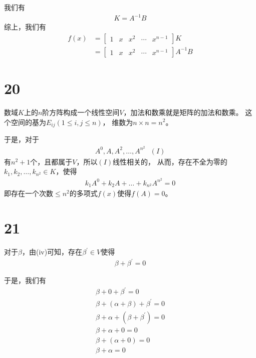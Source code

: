 \documentclass{article}
\begin{document}
我们有
\begin{align*}
  K = A^{-1} B
\end{align*}
综上，我们有
\begin{align*}
  f(x) & = \begin{bmatrix}
             1 & x & x^2 & \cdots & x^{n-1}
           \end{bmatrix} K \\
       & = \begin{bmatrix}
        1 & x & x^2 & \cdots & x^{n-1}
      \end{bmatrix} A^{-1} B
\end{align*}

\section*{20}

数域$K$上的$n$阶方阵构成一个线性空间$V$，加法和数乘就是矩阵的加法和数乘。
这个空间的基为$E_{ij} (1 \leq i,j \leq n)$，
维数为$n \times n = n^2$。

于是，对于
\begin{align*}
  A^{0}, A, A^{2}, \dots, A^{n^2} \ \ \ (I)
\end{align*}
有$n^2 + 1$个，且都属于$V$，所以$(I)$线性相关的，
从而，存在不全为零的$k_1, k_2, \dots, k_{n^2} \in K$，使得
\begin{align*}
  k_1 A^{0} + k_2 A + \dots + k_{n^2} A^{n^2} = 0
\end{align*}
即存在一个次数$\leq n^2$的多项式$f(x)$使得$f(A) = 0$。

\section*{21}

对于$\beta$，由(iv)可知，存在$\beta^\prime \in V$使得
\begin{align*}
  \beta + \beta^\prime = 0
\end{align*}

于是，我们有
\begin{align*}
  \beta + 0 + \beta^\prime = 0                \\
  \beta + (\alpha + \beta) + \beta^\prime = 0 \\
  \beta + \alpha + (\beta + \beta^\prime) = 0 \\
  \beta + \alpha + 0 = 0                      \\
  \beta + (\alpha + 0) = 0                    \\
  \beta + \alpha  = 0
\end{align*}
\end{document}
